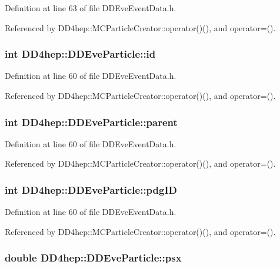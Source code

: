 Definition at line 63 of file DDEveEventData.h.

Referenced by DD4hep::MCParticleCreator::operator()(), and operator=().\hypertarget{class_d_d4hep_1_1_d_d_eve_particle_a230cb6bfdbe03751bc0d2b84da8d32b3}{
\subsubsection[{id}]{\setlength{\rightskip}{0pt plus 5cm}int {\bf DD4hep::DDEveParticle::id}}}
\label{class_d_d4hep_1_1_d_d_eve_particle_a230cb6bfdbe03751bc0d2b84da8d32b3}


Definition at line 60 of file DDEveEventData.h.

Referenced by DD4hep::MCParticleCreator::operator()(), and operator=().\hypertarget{class_d_d4hep_1_1_d_d_eve_particle_aa405afce24519cce61999543be3f0d33}{
\subsubsection[{parent}]{\setlength{\rightskip}{0pt plus 5cm}int {\bf DD4hep::DDEveParticle::parent}}}
\label{class_d_d4hep_1_1_d_d_eve_particle_aa405afce24519cce61999543be3f0d33}


Definition at line 60 of file DDEveEventData.h.

Referenced by DD4hep::MCParticleCreator::operator()(), and operator=().\hypertarget{class_d_d4hep_1_1_d_d_eve_particle_af205b9bbb31c48d31d62a2c5013ff4cd}{
\subsubsection[{pdgID}]{\setlength{\rightskip}{0pt plus 5cm}int {\bf DD4hep::DDEveParticle::pdgID}}}
\label{class_d_d4hep_1_1_d_d_eve_particle_af205b9bbb31c48d31d62a2c5013ff4cd}


Definition at line 60 of file DDEveEventData.h.

Referenced by DD4hep::MCParticleCreator::operator()(), and operator=().\hypertarget{class_d_d4hep_1_1_d_d_eve_particle_afbc3020b2ad0f4df7b3c36929d4cd11e}{
\subsubsection[{psx}]{\setlength{\rightskip}{0pt plus 5cm}double {\bf DD4hep::DDEveParticle::psx}}}
\label{class_d_d4hep_1_1_d_d_eve_particle_afbc3020b2ad0f4df7b3c36929d4cd11e}


